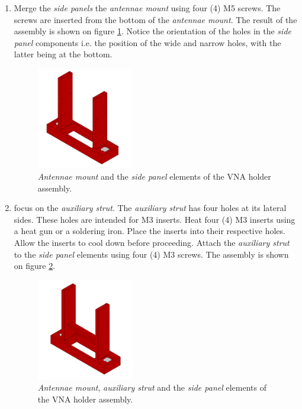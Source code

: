 \documentclass{article}
\begin{document}
\begin{enumerate}
    \item Merge the \textit{side panels} the \textit{antennae mount} using four (4) M5 screws. The screws are inserted from the bottom of the \textit{antennae mount}. The result of the assembly is shown on figure \ref{fig:vna_holder_3}. Notice the orientation of the holes in the \textit{side panel} components i.e. the position of the wide and narrow holes, with the latter being at the bottom.
    
    \begin{figure}[H]
        \centering
        \includegraphics[width=0.4\textwidth]{images/vna_holder/step_C.png}
        \caption{\textit{Antennae mount} and the \textit{side panel} elements of the VNA holder assembly.}
        \label{fig:vna_holder_3}
    \end{figure}
    
    \item focus on the \textit{auxiliary strut}. The \textit{auxiliary strut} has four holes at its lateral sides. These holes are intended for M3 inserts. Heat four (4) M3 inserts using a heat gun or a soldering iron. Place the inserts into their respective holes. Allow the inserts to cool down before proceeding. Attach the \textit{auxiliary strut} to the \textit{side panel} elements using four (4) M3 screws. The assembly is shown on figure \ref{fig:vna_holder_4}.
    
    \begin{figure}[H]
        \centering
        \includegraphics[width=0.4\textwidth]{images/vna_holder/step_D.png}
        \caption{\textit{Antennae mount}, \textit{auxiliary strut} and the \textit{side panel} elements of the VNA holder assembly.}
        \label{fig:vna_holder_4}
    \end{figure}
    

\end{enumerate}
\end{document}
